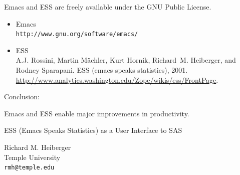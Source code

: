 \newpage

Emacs and ESS are freely available under the GNU Public License.

\begin{itemize}
\setlength{\itemsep}{1ex}
\item
Emacs\\
{\tt http://www.gnu.org/software/emacs/}

\item
ESS\\
A.J. Rossini, Martin M{\"a}chler, Kurt Hornik, Richard~M. Heiberger, and Rodney
  Sparapani.
{ESS} (emacs speaks statistics), 2001.\\
{\huge\url{http://www.analytics.washington.edu/Zope/wikis/ess/FrontPage}.}
\end{itemize}


\newpage
Conclusion:

Emacs and ESS enable major improvements in productivity.


\vspace*{3in}
\begin{center}
ESS (Emacs Speaks Statistics) as a User Interface to SAS
\vspace*{2ex}

Richard M. Heiberger\\
Temple University\\

{\tt rmh@temple.edu}
\vspace*{2ex}
\end{center}



